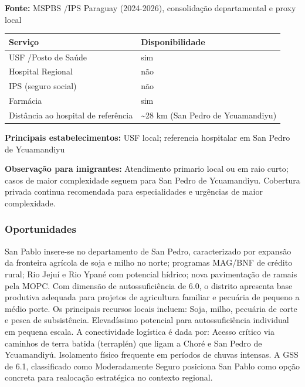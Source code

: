 \textbf{Fonte:} MSPBS /\allowbreak  IPS Paraguay (2024-2026), consolidação
departamental e proxy local

{\def\LTcaptype{none} %
\begin{longtable}[]{@{}
  >{\raggedright\arraybackslash}p{}
  >{\raggedright\arraybackslash}p{}@{}}
\toprule\noalign{}
\begin{minipage}[b]{\linewidth}\raggedright
Serviço
\end{minipage} & \begin{minipage}[b]{\linewidth}\raggedright
Disponibilidade
\end{minipage} \\
\midrule\noalign{}
\endhead
\bottomrule\noalign{}
\endlastfoot
USF /\allowbreak  Posto de Saúde & sim \\
Hospital Regional & não \\
IPS (seguro social) & não \\
Farmácia & sim \\
Distância ao hospital de referência & \textasciitilde28 km (San Pedro de
Ycuamandiyu) \\
\end{longtable}
}

\textbf{Principais estabelecimentos:} USF local; referencia hospitalar
em San Pedro de Ycuamandiyu

\textbf{Observação para imigrantes:} Atendimento primario local ou em
raio curto; casos de maior complexidade seguem para San Pedro de
Ycuamandiyu. Cobertura privada continua recomendada para especialidades
e urgências de maior complexidade.
\newpage

\subsubsection*{Oportunidades}\label{oport-san-pablo-0209}
San Pablo insere-se no departamento de San Pedro, caracterizado por expansão da fronteira agrícola de soja e milho no norte; programas MAG/BNF de crédito rural; Rio Jejuí e Rio Ypané com potencial hídrico; nova pavimentação de ramais pela MOPC. Com dimensão de autossuficiência de 6.0, o distrito apresenta base produtiva adequada para projetos de agricultura familiar e pecuária de pequeno a médio porte. Os principais recursos locais incluem: Soja, milho, pecuária de corte e pesca de subsistência. Elevadíssimo potencial para autossuficiência individual em pequena escala. A conectividade logística é dada por: Acesso crítico via caminhos de terra batida (terraplén) que ligam a Choré e San Pedro de Ycuamandiyú. Isolamento físico frequente em períodos de chuvas intensas. A GSS de 6.1, classificado como Moderadamente Seguro posiciona San Pablo como opção concreta para realocação estratégica no contexto regional.


